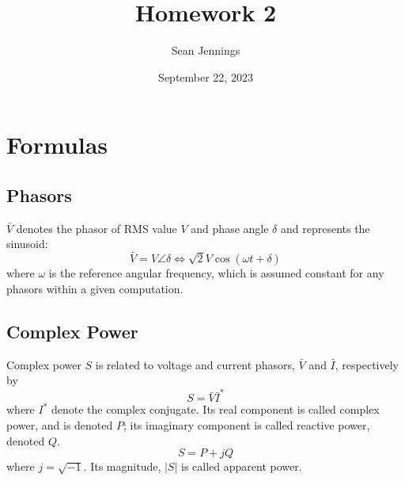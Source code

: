 \documentclass{homework}
\title{Homework 2}
\author{Sean Jennings}
\date{September 22, 2023}
\begin{document}
\maketitle

% 
\newcommand{\eq}[1]{equation (\ref{#1})}
\newcommand{\pf}{\mathcal{PF}}
\newcommand{\W}{\text{ W}}
\newcommand{\kW}{\text{ kW}}
\newcommand{\MW}{\text{ MW}}
\newcommand{\VA}{\text{ VA}}
\newcommand{\kVA}{\text{ kVA}}
\newcommand{\MVA}{\text{ MVA}}
\newcommand{\VAr}{\text{ VAr}}
\newcommand{\kVAr}{\text{ kVAr}}
\newcommand{\MVAr}{\text{ MVAr}}
\newcommand{\angled}[1]{\angle #1 \degree}
\newcommand{\instantaneous}[2]{#1 \cos(\omega t + #2 \degree)}
\newcommand{\instpower}[3]{#1 \biggl(
    1 + \cos(2[\omega t + #3 \degree])
\biggr) + #2 \sin(2[\omega t + #3 \degree])}
\renewcommand{\arccos}{\text{cos}^{-1}}

\section{Formulas}
\subsection{Phasors}
$\bar{V}$ denotes the phasor of RMS value $V$ and phase angle
$\delta$ and represents the sinusoid:
\begin{equation}
    \bar{V} = V \angle \delta \Leftrightarrow
        \sqrt{2} V \cos(\omega t + \delta)
\end{equation}
where $\omega$ is the reference angular frequency, which
is assumed constant for any phasors within a given computation.

\subsection{Complex Power}

Complex power $S$ is related to voltage and current phasors,
$\bar{V}$ and $\bar{I}$, respectively by
\begin{equation}
    S = \bar{V} \bar{I}^*
    \label{eq:complex-power-from-phasors}
\end{equation}
where $I^*$ denote the complex conjugate. Its real component
is called complex power, and is denoted $P$; its imaginary
component is called reactive power, denoted $Q$.
\begin{equation}
    S = P + jQ
    \label{eq:complex-power-components}
\end{equation}
where $j = \sqrt{-1}$. Its magnitude, $|S|$ is called apparent
power.
\end{document}

